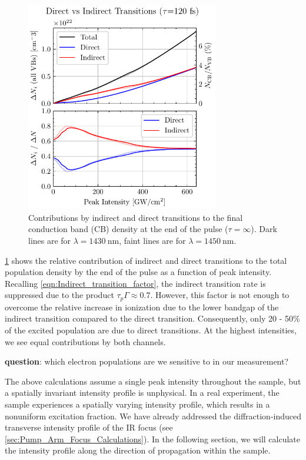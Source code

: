 \begin{figure}
	\centering
	\includegraphics[width=0.75\textwidth]{figures/chap4/Direct_vs_Indirect_Trans.pdf}
	\caption{Contributions by indirect and direct transitions to the final conduction band (CB) density at the end of the pulse ($\tau = \infty$). Dark lines are for $\lambda = 1430 \ \textrm{nm}$, faint lines are for $\lambda = 1450 \ \textrm{nm}$.}
	\label{fig:Direct_vs_Indirect_Trans}
\end{figure}

\cref{fig:Direct_vs_Indirect_Trans} shows the relative contribution of indirect and direct transitions to the total population density by the end of the pulse as a function of peak intensity. Recalling \cref{eqn:Indirect_transition_factor}, the indirect transition rate is suppressed due to the product $\tau_p \Gamma \approx 0.7$. However, this factor is not enough to overcome the relative increase in ionization due to the lower bandgap of the indirect transition compared to the direct transition. Consequently, only {20 - 50\%} of the excited population are due to direct transitions. At the highest intensities, we see equal contributions by both channels.

\textbf{question}: which electron populations are we sensitive to in our measurement?

The above calculations assume a single peak intensity throughout the sample, but a spatially invariant intensity profile is unphysical. In a real experiment, the sample experiences a spatially varying intensity profile, which results in a nonuniform excitation fraction. We have already addressed the diffraction-induced transverse intensity profile of the IR focus (see \cref{sec:Pump_Arm_Focus_Calculations}). In the following section, we will calculate the intensity profile along the direction of propagation within the sample.


